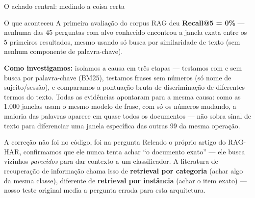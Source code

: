 \documentclass{beamer}
\newenvironment{numerobloco}[1]{\begin{block}{#1}}{\end{block}}
\newenvironment{decisaobloco}[1]{\begin{alertblock}{#1}}{\end{alertblock}}
\begin{document}
\begin{frame}{O achado central: medindo a coisa certa}
  \small
  \begin{numerobloco}{O que aconteceu}
    A primeira avaliação do corpus RAG deu \textbf{Recall@5 = 0\%} — nenhuma das 45 perguntas
    com alvo conhecido encontrou a janela exata entre os 5 primeiros resultados, mesmo usando
    só busca por similaridade de texto (sem nenhum componente de palavra-chave).
  \end{numerobloco}

  \pause
  \textbf{Como investigamos:} isolamos a causa em três etapas — testamos com e sem busca por
  palavra-chave (BM25), testamos frases sem números (só nome de sujeito/sessão), e comparamos
  a pontuação bruta de discriminação de diferentes termos do texto. Todas as evidências
  apontaram para a mesma causa: como as 1.000 janelas usam o mesmo modelo de frase, com só os
  números mudando, a maioria das palavras aparece em quase todos os documentos — não sobra
  sinal de texto para diferenciar uma janela específica das outras 99 da mesma operação.

  \pause
  \begin{decisaobloco}{A correção não foi no código, foi na pergunta}
    Relendo o próprio artigo do RAG-HAR, confirmamos que ele nunca tenta achar ``o documento
    exato'' — ele busca vizinhos \emph{parecidos} para dar contexto a um classificador. A
    literatura de recuperação de informação chama isso de \textbf{retrieval por categoria}
    (achar algo da mesma classe), diferente de \textbf{retrieval por instância} (achar o item
    exato) — nosso teste original media a pergunta errada para esta arquitetura.
  \end{decisaobloco}
\end{frame}
\end{document}
